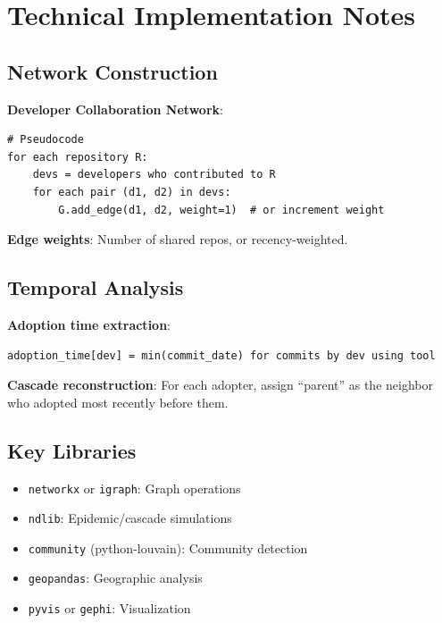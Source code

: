 \documentclass[11pt,letterpaper]{article}
\begin{document}
\section{Technical Implementation Notes}

\subsection{Network Construction}

\textbf{Developer Collaboration Network}:
\begin{verbatim}
# Pseudocode
for each repository R:
    devs = developers who contributed to R
    for each pair (d1, d2) in devs:
        G.add_edge(d1, d2, weight=1)  # or increment weight
\end{verbatim}

\textbf{Edge weights}: Number of shared repos, or recency-weighted.

\subsection{Temporal Analysis}

\textbf{Adoption time extraction}:
\begin{verbatim}
adoption_time[dev] = min(commit_date) for commits by dev using tool
\end{verbatim}

\textbf{Cascade reconstruction}: For each adopter, assign ``parent'' as the neighbor who adopted most recently before them.

\subsection{Key Libraries}

\begin{itemize}
    \item \texttt{networkx} or \texttt{igraph}: Graph operations
    \item \texttt{ndlib}: Epidemic/cascade simulations
    \item \texttt{community} (python-louvain): Community detection
    \item \texttt{geopandas}: Geographic analysis
    \item \texttt{pyvis} or \texttt{gephi}: Visualization
\end{itemize}
\end{document}
